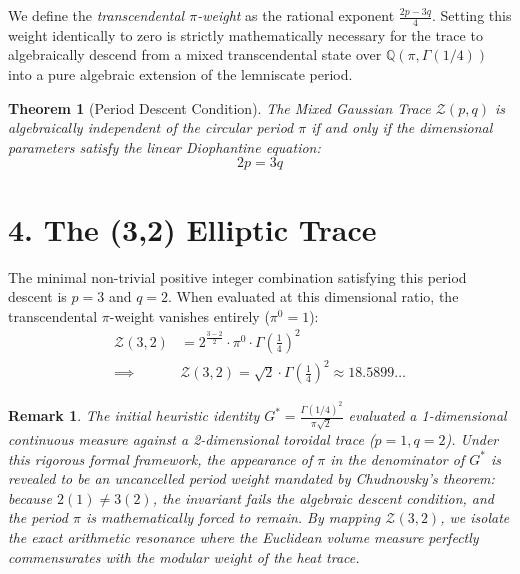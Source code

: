 \documentclass[12pt]{article}
\newtheorem{theorem}{Theorem}
\newtheorem{remark}{Remark}
\begin{document}
We define the \textit{transcendental $\pi$-weight} as the rational exponent $\frac{2p-3q}{4}$. Setting this weight identically to zero is strictly mathematically necessary for the trace to algebraically descend from a mixed transcendental state over $\mathbb{Q}(\pi, \Gamma(1/4))$ into a pure algebraic extension of the lemniscate period.

\begin{theorem}[Period Descent Condition]
The Mixed Gaussian Trace $\mathcal{Z}(p,q)$ is algebraically independent of the circular period $\pi$ if and only if the dimensional parameters satisfy the linear Diophantine equation:
\begin{equation}
    2p = 3q
\end{equation}
\end{theorem}

\section*{4. The (3,2) Elliptic Trace}
The minimal non-trivial positive integer combination satisfying this period descent is $p=3$ and $q=2$. When evaluated at this dimensional ratio, the transcendental $\pi$-weight vanishes entirely ($\pi^0 = 1$):
\begin{align}
    \mathcal{Z}(3, 2) &= 2^{\frac{3-2}{2}} \cdot \pi^0 \cdot \Gamma\left(\frac{1}{4}\right)^2 \nonumber \\
    \implies \quad &\boxed{ \mathcal{Z}(3, 2) = \sqrt{2} \cdot \Gamma\left(\frac{1}{4}\right)^2 \approx 18.5899\dots }
\end{align}

\begin{remark}
The initial heuristic identity $G^* = \frac{\Gamma(1/4)^2}{\pi\sqrt{2}}$ evaluated a 1-dimensional continuous measure against a 2-dimensional toroidal trace ($p=1, q=2$). Under this rigorous formal framework, the appearance of $\pi$ in the denominator of $G^*$ is revealed to be an uncancelled period weight mandated by Chudnovsky's theorem: because $2(1) \neq 3(2)$, the invariant fails the algebraic descent condition, and the period $\pi$ is mathematically forced to remain. By mapping $\mathcal{Z}(3,2)$, we isolate the exact arithmetic resonance where the Euclidean volume measure perfectly commensurates with the modular weight of the heat trace.
\end{remark}
\end{document}
